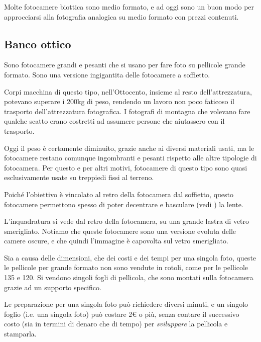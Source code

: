 Molte fotocamere biottica sono medio formato, e ad oggi sono un buon modo per approcciarsi alla fotografia analogica su medio formato con prezzi contenuti.


\subsection{Banco ottico} \label{subsec:bancoottico}
Sono fotocamere grandi e pesanti che si usano per fare foto su pellicole grande formato. Sono una versione ingigantita delle fotocamere a soffietto.

Corpi macchina di questo tipo, nell'Ottocento, insieme al resto dell'attrezzatura, potevano superare i 200kg di peso, rendendo un lavoro non poco faticoso il trasporto dell'attrezzatura fotografica.
I fotografi di montagna che volevano fare qualche scatto erano costretti ad assumere persone che aiutassero con il trasporto.

Oggi il peso è certamente diminuito, grazie anche ai diversi materiali usati, ma le fotocamere restano comunque ingombranti e pesanti rispetto alle altre tipologie di fotocamera.
Per questo e per altri motivi, fotocamere di questo tipo sono quasi esclusivamente usate su treppiedi fissi al terreno.

Poiché l'obiettivo è vincolato al retro della fotocamera dal soffietto, questo fotocamere permettono spesso di poter decentrare e basculare (vedi ) la lente.

L'inquadratura si vede dal retro della fotocamera, su una grande lastra di vetro smerigliato. Notiamo che queste fotocamere sono una versione evoluta delle camere oscure, e che quindi l'immagine è capovolta sul vetro smerigliato.

Sia a causa delle dimensioni, che dei costi e dei tempi per una singola foto, queste le pellicole per grande formato non sono vendute in rotoli, come per le pellicole 135 e 120.
Si vendono singoli fogli di pellicola, che sono montati sulla fotocamera grazie ad un supporto specifico.

Le preparazione per una singola foto può richiedere diversi minuti, e un singolo foglio (i.e. una singola foto) può costare 2$\euro$ o più, senza contare il successivo costo (sia in termini di denaro che di tempo) per \textit{sviluppare} la pellicola e stamparla.